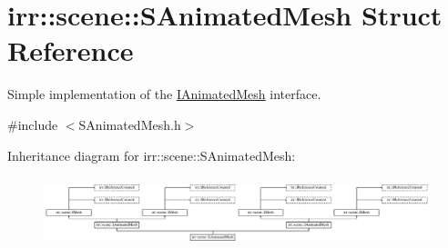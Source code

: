 \hypertarget{structirr_1_1scene_1_1SAnimatedMesh}{}\section{irr\+:\+:scene\+:\+:S\+Animated\+Mesh Struct Reference}
\label{structirr_1_1scene_1_1SAnimatedMesh}


Simple implementation of the \hyperlink{classirr_1_1scene_1_1IAnimatedMesh}{I\+Animated\+Mesh} interface.  




{\ttfamily \#include $<$S\+Animated\+Mesh.\+h$>$}

Inheritance diagram for irr\+:\+:scene\+:\+:S\+Animated\+Mesh\+:\begin{figure}[H]
\begin{center}
\leavevmode
\includegraphics[height=2.058824cm]{structirr_1_1scene_1_1SAnimatedMesh}
\end{center}
\end{figure}
